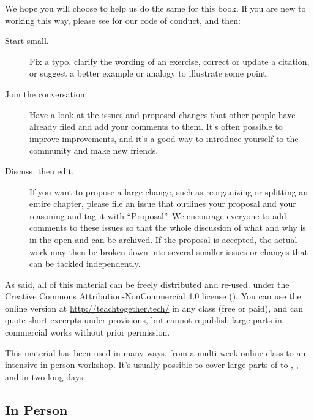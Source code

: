
We hope you will choose to help us do the same for this book.
If you are new to working this way,
please see  for our code of conduct,
and then:

\begin{description}

\item[Start small.]
  Fix a typo,
  clarify the wording of an exercise,
  correct or update a citation,
  or suggest a better example or analogy to illustrate some point.

\item[Join the conversation.]
  Have a look at the issues and proposed changes that other people have already filed
  and add your comments to them.
  It's often possible to improve improvements,
  and it's a good way to introduce yourself to the community and make new friends.

\item[Discuss, then edit.]
  If you want to propose a large change,
  such as reorganizing or splitting an entire chapter,
  please file an issue that outlines your proposal and your reasoning and tag it with ``Proposal''.
  We encourage everyone to add comments to these issues
  so that the whole discussion of what and why is in the open and can be archived.
  If the proposal is accepted,
  the actual work may then be broken down into several smaller issues or changes
  that can be tackled independently.

\end{description}


As  said,
all of this material can be freely distributed and re-used.
under the Creative Commons Attribution-NonCommercial 4.0 license
().
You can use the online version at \url{http://teachtogether.tech/} in any class (free or paid),
and can quote short excerpts under  provisions,
but cannot republish large parts in commercial works without prior permission.

This material has been used in many ways,
from a multi-week online class to an intensive in-person workshop.
It's usually possible to cover large parts of  to ,
,
and  in two long days.

\subsection*{In Person}

